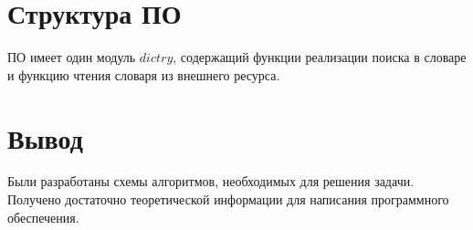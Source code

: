 \section{Структура ПО}

ПО имеет один модуль $dictry$, содержащий функции реализации поиска в словаре и функцию чтения словаря из внешнего ресурса.

\section{Вывод}

Были разработаны схемы алгоритмов, необходимых для решения задачи. Получено достаточно теоретической информации для написания программного обеспечения.
